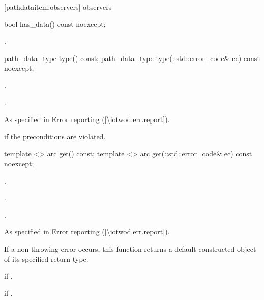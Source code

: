  [pathdataitem.observers] { observers}

\begin{itemdecl}
    bool has_data() const noexcept;
\end{itemdecl}
\begin{itemdescr}
	\pnum
	\returns
	.
	
\end{itemdescr}

\begin{itemdecl}
    path_data_type type() const;
    path_data_type type(::std::error_code& ec) const noexcept;
\end{itemdecl}
\begin{itemdescr}
	\pnum
	\preconditions
	.
	
	\pnum
	\returns
	.
	
	\pnum
	\throws
	As specified in Error reporting (\ref{\iotwod.err.report}).
	
	\pnum
	\errors
	 if the preconditions are violated.

\end{itemdescr}

\begin{itemdecl}
    template <>
    arc get() const;
    template <>
    arc get(::std::error_code& ec) const noexcept;
\end{itemdecl}
\begin{itemdescr}
	\pnum
	\preconditions
	.
	
	\pnum
	.
	
	\pnum
	\returns
	.
	
	\pnum
	\throws
	As specified in Error reporting (\ref{\iotwod.err.report}).
	
	\pnum
	\remarks
	If a non-throwing error occurs, this function returns a default constructed object of its specified return type.
	
	\pnum
	\errors
	 if .
	
	\pnum
	 if .

\end{itemdescr}

